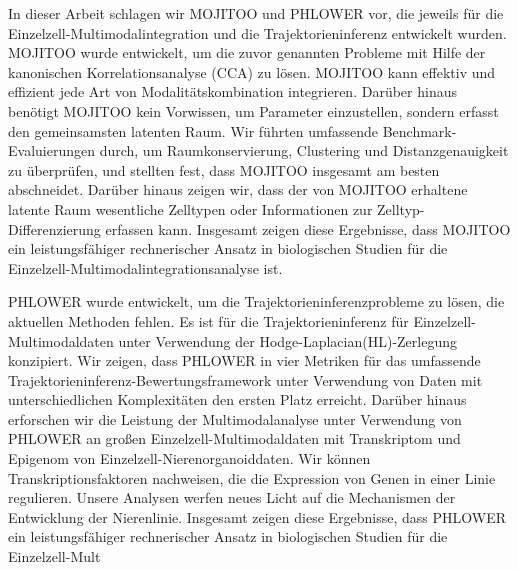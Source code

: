 In dieser Arbeit schlagen wir MOJITOO und PHLOWER vor, die jeweils für die Einzelzell-Multimodalintegration und die Trajektorieninferenz entwickelt wurden. MOJITOO wurde entwickelt, um die zuvor genannten Probleme mit Hilfe der kanonischen Korrelationsanalyse (CCA) zu lösen. MOJITOO kann effektiv und effizient jede Art von Modalitätskombination integrieren. Darüber hinaus benötigt MOJITOO kein Vorwissen, um Parameter einzustellen, sondern erfasst den gemeinsamsten latenten Raum. Wir führten umfassende Benchmark-Evaluierungen durch, um Raumkonservierung, Clustering und Distanzgenauigkeit zu überprüfen, und stellten fest, dass MOJITOO insgesamt am besten abschneidet. Darüber hinaus zeigen wir, dass der von MOJITOO erhaltene latente Raum wesentliche Zelltypen oder Informationen zur Zelltyp-Differenzierung erfassen kann. Insgesamt zeigen diese Ergebnisse, dass MOJITOO ein leistungsfähiger rechnerischer Ansatz in biologischen Studien für die Einzelzell-Multimodalintegrationsanalyse ist.

PHLOWER wurde entwickelt, um die Trajektorieninferenzprobleme zu lösen, die aktuellen Methoden fehlen. Es ist für die Trajektorieninferenz für Einzelzell-Multimodaldaten unter Verwendung der Hodge-Laplacian(HL)-Zerlegung konzipiert. Wir zeigen, dass PHLOWER in vier Metriken für das umfassende Trajektorieninferenz-Bewertungsframework unter Verwendung von Daten mit unterschiedlichen Komplexitäten den ersten Platz erreicht. Darüber hinaus erforschen wir die Leistung der Multimodalanalyse unter Verwendung von PHLOWER an großen Einzelzell-Multimodaldaten mit Transkriptom und Epigenom von Einzelzell-Nierenorganoiddaten. Wir können Transkriptionsfaktoren nachweisen, die die Expression von Genen in einer Linie regulieren. Unsere Analysen werfen neues Licht auf die Mechanismen der Entwicklung der Nierenlinie. Insgesamt zeigen diese Ergebnisse, dass PHLOWER ein leistungsfähiger rechnerischer Ansatz in biologischen Studien für die Einzelzell-Mult